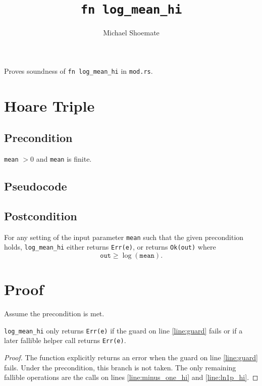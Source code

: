 \documentclass{article}
\title{\texttt{fn log\_mean\_hi}}
\author{Michael Shoemate}
\begin{document}
\maketitle

Proves soundness of \texttt{fn log\_mean\_hi} in \texttt{mod.rs}.

\section{Hoare Triple}
\subsection*{Precondition}
\texttt{mean} $> 0$ and \texttt{mean} is finite.

\subsection*{Pseudocode}


\subsection*{Postcondition}
\begin{theorem}
\label{postcondition}
For any setting of the input parameter \texttt{mean} such that the given precondition holds,
\texttt{log\_mean\_hi} either returns \texttt{Err(e)},
or returns \texttt{Ok(out)} where
\[
\texttt{out} \ge \log(\texttt{mean}).
\]
\end{theorem}

\section{Proof}
Assume the precondition is met.

\begin{lemma}
\label{err-e}
\texttt{log\_mean\_hi} only returns \texttt{Err(e)} if the guard on line \ref{line:guard} fails
or if a later fallible helper call returns \texttt{Err(e)}.
\end{lemma}

\begin{proof}
The function explicitly returns an error when the guard on line \ref{line:guard} fails.
Under the precondition, this branch is not taken.
The only remaining fallible operations are the calls on lines \ref{line:minus_one_hi}
and \ref{line:ln1p_hi}.
\end{proof}
\end{document}
